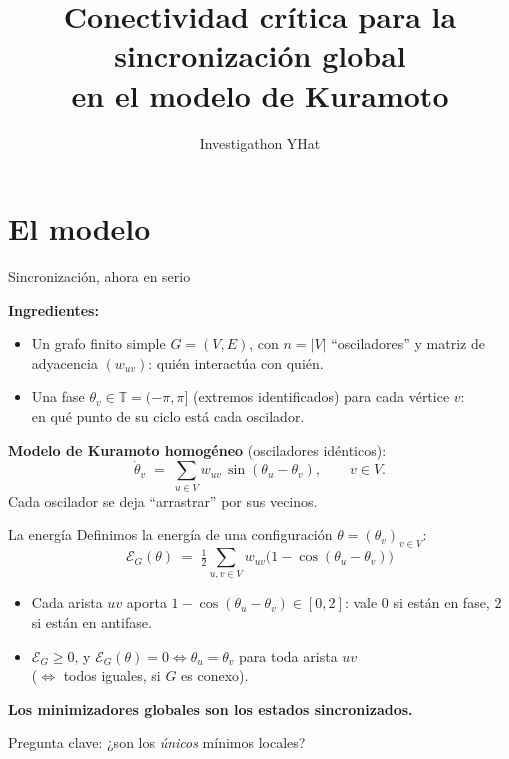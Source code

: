 \documentclass[10pt,aspectratio=169]{beamer}
\title[Kuramoto y matrix completion]{Conectividad crítica para la sincronización global\\ en el modelo de Kuramoto}
\author{Investigathon YHat}
\date{}
\newcommand{\T}{\mathbb{T}}
\newcommand{\E}{\mathcal{E}}
\begin{document}
\begin{frame}[plain]
\titlepage
\end{frame}

\section{El modelo}

\begin{frame}{Sincronización, ahora en serio}


\textbf{Ingredientes:}
\begin{itemize}
    \item Un grafo finito simple $G=(V,E)$, con $n=|V|$ ``osciladores'' y matriz de adyacencia $(w_{uv})$: quién interactúa con quién.

    \item Una fase $\theta_v \in \T = (-\pi,\pi]$ (extremos identificados) para cada vértice $v$:\\
    en qué punto de su ciclo está cada oscilador.
\end{itemize}
\medskip
\pause

\textbf{Modelo de Kuramoto homogéneo} (osciladores idénticos):
\[
\dot\theta_v \;=\; \sum_{u \in V} w_{uv}\,\sin(\theta_u - \theta_v), \qquad v\in V.
\]
Cada oscilador se deja ``arrastrar'' por sus vecinos.
\end{frame}

\begin{frame}{La energía}
Definimos la energía de una configuración $\theta = (\theta_v)_{v\in V}$:
\[
\boxed{\;\E_G(\theta) \;=\; \tfrac{1}{2}\sum_{u,v\in V} w_{uv}\bigl(1-\cos(\theta_u-\theta_v)\bigr)\;}
\]
\begin{itemize}
    \item Cada arista $uv$ aporta $1-\cos(\theta_u-\theta_v) \in [0,2]$: vale $0$ si están en fase, $2$ si están en antifase.
    \item $\E_G \ge 0$, y $\E_G(\theta) = 0 \iff \theta_u = \theta_v$ para toda arista $uv$ \\
    ($\iff$ todos iguales, si $G$ es conexo).
\end{itemize}
\pause
\medskip
\textbf{Los minimizadores globales son los estados sincronizados.}
\medskip

Pregunta clave: ¿son los \emph{únicos} mínimos locales?
\end{frame}
\end{document}

